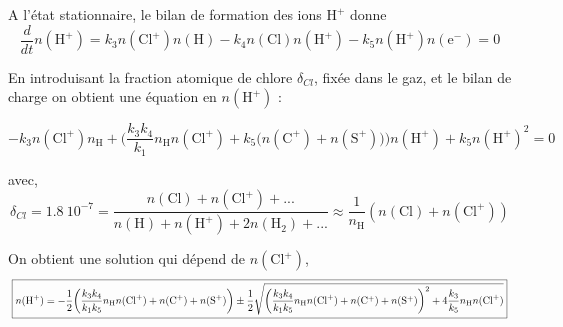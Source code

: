 A l'état stationnaire, le bilan de formation des ions $\mathrm{H}^+$ donne
\begin{equation}\label{eq:h+}
    \frac{d}{dt}n(\mathrm{H}^+) = k_3n(\mathrm{Cl}^+)n(\mathrm{H}) - k_4n(\mathrm{Cl})n(\mathrm{H}^+) - k_5 n(\mathrm{H}^+)n(\mathrm{e}^-) = 0
\end{equation}

En introduisant la fraction atomique de chlore $\delta_{Cl}$, fixée dans le gaz, et le bilan de charge on obtient une équation en $n(\mathrm{H}^+)$ :

\begin{equation}
    -k_3n(\mathrm{Cl}^+)n_{\mathrm{H}} + \bigg( \frac{k_3 k_4}{k_1} n_{\mathrm{H}} n(\mathrm{Cl}^+) + k_5 \big(n(\mathrm{C}^+)+ n(\mathrm{S}^+)\big) \bigg) n(\mathrm{H}^+) + k_5 n(\mathrm{H}^+)^2 = 0
\end{equation}

 avec,
\begin{equation}
    \delta_{Cl} = \SI{1.8}{10^{-7}} = \frac{n(\mathrm{Cl}) + n(\mathrm{Cl}^+) + ...}{n(\mathrm{H}) + n(\mathrm{H}^+) + 2n(\mathrm{H}_2) + ...} \approx \frac{1}{n_{\mathrm{H}}} (n(\mathrm{Cl}) + n(\mathrm{Cl}^+) )
\end{equation}

On obtient une solution qui dépend de $n(\mathrm{Cl}^+)$,
\begin{equation}
\resizebox{1.1\hsize}{!}{
    \boxed{n(\mathrm{H}^+) = -\frac{1}{2} \bigg( \frac{k_3 k_4}{k_1 k_5} n_{\mathrm{H}} n(\mathrm{Cl}^+) + n(\mathrm{C}^+)+ n(\mathrm{S}^+) \bigg) \pm \frac{1}{2} \sqrt{\bigg( \frac{k_3 k_4}{k_1 k_5} n_{\mathrm{H}} n(\mathrm{Cl}^+) + n(\mathrm{C}^+)+ n(\mathrm{S}^+) \bigg)^2 + 4\frac{k_3}{k_5}n_{\mathrm{H}} n(\mathrm{Cl}^+)}}
    }
\end{equation}


